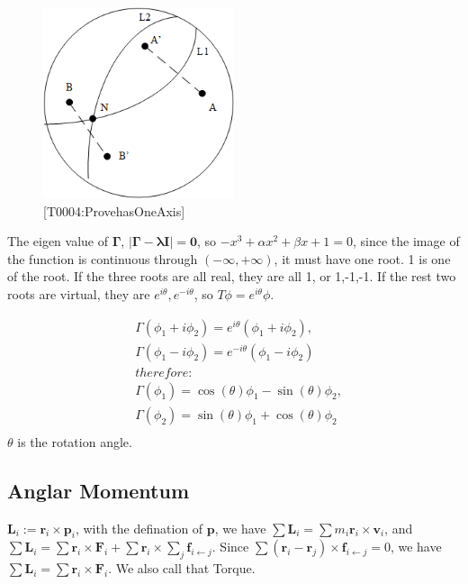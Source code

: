 \documentclass[UTF8]{book}
\begin{document}
\begin{figure}[h]
    \centering
    \includegraphics[width=0.5\textwidth]{../../resources/T0004_20211212_ProvehasOneAxis.png}
    \caption{[T0004:ProvehasOneAxis]}
\end{figure}

The eigen value of $\boldsymbol{\Gamma }$, $\left\lvert \boldsymbol{\Gamma }-\boldsymbol{\lambda I}\right\rvert = \boldsymbol{0}$, so $-x^3 +\alpha x^2 +\beta x +1 = 0$, since the image of the function is continuous through $(-\infty , + \infty )$, it must have one root. 1 is one of the root. If the three roots are all real, they are all 1, or 1,-1,-1. If the rest two roots are virtual, they are $e^{i\theta},e^{-i\theta}$, so $T \phi = e^{i\theta} \phi $. 



\begin{equation}
    \begin{split}
    &\Gamma (\phi_1 + i \phi_2)   = e^{i\theta}(\phi_1 + i \phi_2) ,\\
    & \Gamma (\phi_1 - i \phi_2)   = e^{-i\theta}(\phi_1 - i \phi_2) \\
    &therefore:\\
    & \Gamma (\phi_1 ) = \cos(\theta) \phi_1  - \sin(\theta) \phi_2, \\
    &  \Gamma (\phi_2) = \sin(\theta) \phi_1  +\cos(\theta) \phi_2\\
\end{split}
\end{equation}
$\theta$ is the rotation angle.







\subsection{Anglar Momentum}
$\boldsymbol{L}_i := \boldsymbol{r}_i \times \boldsymbol{p}_i  $, with the defination of $\boldsymbol{p}$, we have $\sum \boldsymbol{L}_i  =\sum m_i \boldsymbol{r}_i \times \boldsymbol{v}_i$, and $\sum \boldsymbol{L}_i  =\sum \boldsymbol{r}_i \times \boldsymbol{F}_i + \sum \boldsymbol{r}_i \times \sum_j \boldsymbol{f}_{i \leftarrow j}$. Since $\sum(\boldsymbol{r}_i -\boldsymbol{r}_j) \times \boldsymbol{f}_{i \leftarrow j}  = 0$, we have $\sum \boldsymbol{L}_i  =\sum \boldsymbol{r}_i \times \boldsymbol{F}_i $. We also call that Torque.
\end{document}
